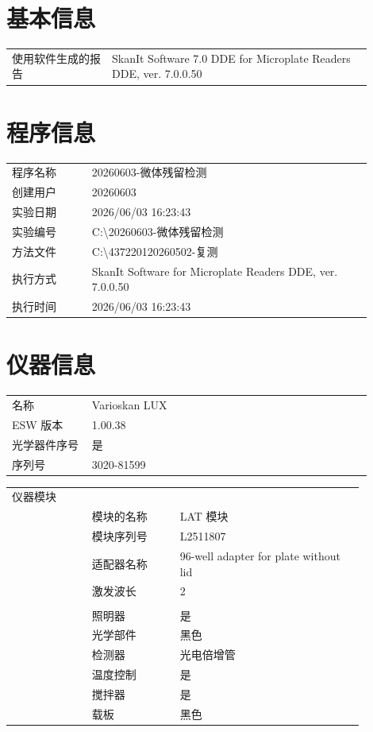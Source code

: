\documentclass[UTF8,10pt,a4paper,fontset=fandol]{ctexart}
\begin{document}
\vspace{1em}
\section*{基本信息}

\begin{tabular}{p{0.25\linewidth}p{0.65\linewidth}}
使用软件生成的报告 & SkanIt Software 7.0 DDE for Microplate Readers DDE, ver. 7.0.0.50
\end{tabular}

\section*{程序信息}

\begin{tabular}{p{0.20\linewidth}p{0.70\linewidth}}
程序名称 & 20260603-微体残留检测\\
创建用户 & 20260603\\
实验日期 & 2026/06/03 16:23:43\\
实验编号 & C:\textbackslash 20260603-微体残留检测\\
方法文件 & C:\textbackslash 437220120260502-复测\\
执行方式 & SkanIt Software for Microplate Readers DDE, ver. 7.0.0.50\\
执行时间 & 2026/06/03 16:23:43
\end{tabular}

\section*{仪器信息}

\begin{tabular}{p{0.20\linewidth}p{0.70\linewidth}}
名称 & Varioskan LUX\\
ESW 版本 & 1.00.38\\
光学器件序号 & 是\\
序列号 & 3020-81599
\end{tabular}

\vspace{0.5em}
\begin{tabular}{p{0.20\linewidth}p{0.22\linewidth}p{0.46\linewidth}}
仪器模块 & & \\
& 模块的名称 & LAT 模块\\
& 模块序列号 & L2511807\\
& 适配器名称 & 96-well adapter for plate without lid\\
& 激发波长 & 2\\
& & \\
& 照明器 & 是\\
& 光学部件 & 黑色\\
& 检测器 & 光电倍增管\\
& 温度控制 & 是\\
& 搅拌器 & 是\\
& 载板 & 黑色
\end{tabular}
\end{document}
